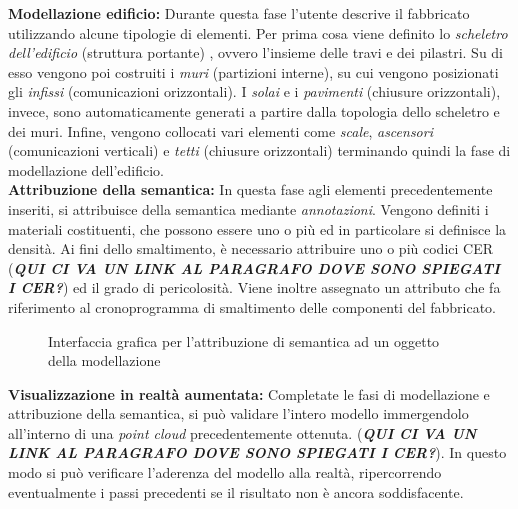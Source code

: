 \noindent \textbf{Modellazione edificio:} Durante questa fase l'utente descrive il fabbricato utilizzando alcune tipologie di elementi. Per prima cosa viene definito lo \textit{scheletro dell'edificio} (struttura portante) , ovvero l'insieme delle travi e dei pilastri. Su di esso vengono poi costruiti i \textit{muri} (partizioni interne), su cui vengono posizionati gli \textit{infissi} (comunicazioni orizzontali). I \textit{solai} e i \textit{pavimenti} (chiusure orizzontali), invece, sono automaticamente generati a partire dalla topologia dello scheletro e dei muri. Infine, vengono collocati vari elementi come \textit{scale}, \textit{ascensori} (comunicazioni verticali) e \textit{tetti} (chiusure orizzontali) terminando quindi la fase di modellazione dell'edificio.\\

\noindent \textbf{Attribuzione della semantica:} In questa fase agli elementi precedentemente inseriti, si attribuisce della semantica mediante \textit{annotazioni}. Vengono definiti i materiali costituenti, che possono essere uno o pi\`u ed in particolare si definisce la densit\`a. Ai fini dello smaltimento, \`e necessario attribuire uno o pi\`u codici CER (\textbf{\textit{QUI CI VA UN LINK AL PARAGRAFO DOVE SONO SPIEGATI I CER?}}) ed il grado di pericolosit\`a. Viene inoltre assegnato un attributo che fa riferimento al cronoprogramma di smaltimento delle componenti del fabbricato.\\

\begin{figure}[!h]
  \centering
   {}
  \caption{Interfaccia grafica per l'attribuzione di semantica ad un oggetto della modellazione}
  \label{fig:semantics}
\end{figure}

\noindent \textbf{Visualizzazione in realt\`a aumentata:} Completate le fasi di modellazione e attribuzione della semantica, si pu\`o validare l'intero modello immergendolo all'interno di una \textit{point cloud} precedentemente ottenuta. (\textbf{\textit{QUI CI VA UN LINK AL PARAGRAFO DOVE SONO SPIEGATI I CER?}}). In questo modo si pu\`o verificare l'aderenza del modello alla realt\`a, ripercorrendo eventualmente i passi precedenti se il risultato non \`e ancora soddisfacente.\\

